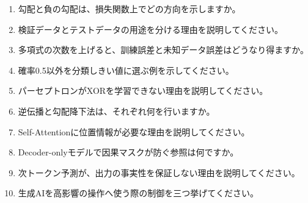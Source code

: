 \begingroup
  \begin{enumerate}
    \item 勾配と負の勾配は、損失関数上でどの方向を示しますか。
    \item 検証データとテストデータの用途を分ける理由を説明してください。
    \item 多項式の次数を上げると、訓練誤差と未知データ誤差はどうなり得ますか。
    \item 確率0.5以外を分類しきい値に選ぶ例を示してください。
    \item パーセプトロンがXORを学習できない理由を説明してください。
    \item 逆伝播と勾配降下法は、それぞれ何を行いますか。
    \item Self-Attentionに位置情報が必要な理由を説明してください。
    \item Decoder-onlyモデルで因果マスクが防ぐ参照は何ですか。
    \item 次トークン予測が、出力の事実性を保証しない理由を説明してください。
    \item 生成AIを高影響の操作へ使う際の制御を三つ挙げてください。
  \end{enumerate}
\par
\endgroup
